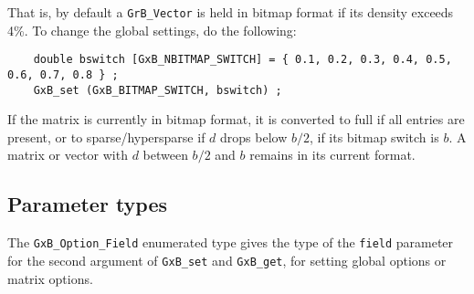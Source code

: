 \documentclass[12pt]{article}
\begin{document}
That is, by default a \verb'GrB_Vector' is held in bitmap format if its density
exceeds 4\%.  To change the global settings, do the following:

{\footnotesize
\begin{verbatim}
    double bswitch [GxB_NBITMAP_SWITCH] = { 0.1, 0.2, 0.3, 0.4, 0.5, 0.6, 0.7, 0.8 } ;
    GxB_set (GxB_BITMAP_SWITCH, bswitch) ;
\end{verbatim}
}

If the matrix is currently in bitmap format, it is converted to full if all
entries are present, or to sparse/hypersparse if $d$ drops below $b/2$, if its
bitmap switch is $b$.  A matrix or vector with $d$ between $b/2$ and $b$
remains in its current format.

\subsection{Parameter types}
The \verb'GxB_Option_Field' enumerated type gives the type of the \verb'field'
parameter for the second argument of \verb'GxB_set' and \verb'GxB_get',
for setting global options or matrix options.
\end{document}

